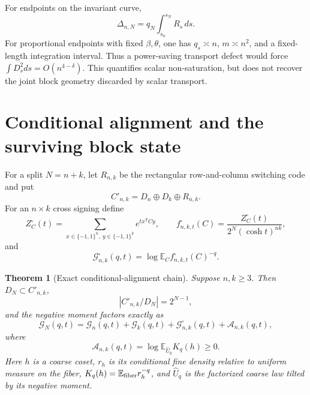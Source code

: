 \documentclass[11pt]{article}
\newtheorem{theorem}{Theorem}
\newcommand{\eps}{\{-1,1\}}
\newcommand{\E}{\mathbb E}
\begin{document}
For endpoints on the invariant curve,
\[
 \Delta_{n,N}=q_N\int_{s_n}^{s_N}R_s\,ds.
\]
For proportional endpoints with fixed $\beta,\theta$, one has
$q_s\asymp n$, $m\asymp n^2$, and a fixed-length integration interval.
Thus a power-saving transport defect would force
$\int D_s^2ds=O(n^{4-\delta})$.  This quantifies scalar non-saturation, but
does not recover the joint block geometry discarded by scalar transport.

\section{Conditional alignment and the surviving block state}

For a split $N=n+k$, let $R_{n,k}$ be the rectangular row-and-column
switching code and put
\[
 C'_{n,k}=D_n\oplus D_k\oplus R_{n,k}.
\]
For an $n\times k$ cross signing define
\[
 Z_C^\square(t)=\sum_{x\in\eps^n,\ y\in\eps^k}
 e^{t x^{\mathsf T}Cy},\qquad
 f_{n,k,t}^\square(C)
 =\frac{Z_C^\square(t)}{2^N(\cosh t)^{nk}},
\]
and
\[
 \mathcal G_{n,k}^\square(q,t)
 =\log\E_C f_{n,k,t}^\square(C)^{-q}.
\]

\begin{theorem}[Exact conditional-alignment chain]
\label{thm:alignment-chain}
Suppose $n,k\ge3$.  Then $D_N\subset C'_{n,k}$,
\[
 |C'_{n,k}/D_N|=2^{N-1},
\]
and the negative moment factors exactly as
\begin{equation}
 \mathcal G_N(q,t)=\mathcal G_n(q,t)+\mathcal G_k(q,t)
 +\mathcal G_{n,k}^{\square}(q,t)+\mathcal A_{n,k}(q,t),
 \label{eq:alignment-chain}
\end{equation}
where
\[
 \mathcal A_{n,k}(q,t)=\log\E_{\widehat U_q}K_q(h)\ge0.
\]
Here $h$ is a coarse coset, $r_h$ is its conditional fine density relative to
uniform measure on the fiber,
$K_q(h)=\E_{\rm fiber}r_h^{-q}$, and $\widehat U_q$ is the factorized coarse
law tilted by its negative moment.
\end{theorem}
\end{document}
